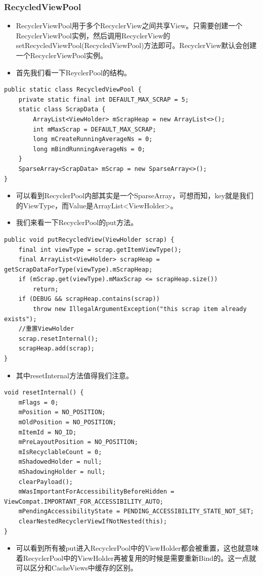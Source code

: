 \documentclass[9pt, b5paper]{article}
\begin{document}
\subsubsection{RecycledViewPool}
\label{sec-5-3-8}
\begin{itemize}
\item RecyclerViewPool用于多个RecyclerView之间共享View。只需要创建一个RecyclerViewPool实例，然后调用RecyclerView的setRecycledViewPool(RecycledViewPool)方法即可。RecyclerView默认会创建一个RecyclerViewPool实例。
\item 首先我们看一下ReyclerPool的结构。
\end{itemize}
\begin{verbatim}
public static class RecycledViewPool {
    private static final int DEFAULT_MAX_SCRAP = 5;
    static class ScrapData {
        ArrayList<ViewHolder> mScrapHeap = new ArrayList<>();
        int mMaxScrap = DEFAULT_MAX_SCRAP;
        long mCreateRunningAverageNs = 0;
        long mBindRunningAverageNs = 0;
    }
    SparseArray<ScrapData> mScrap = new SparseArray<>();
}
\end{verbatim}
\begin{itemize}
\item 可以看到RecyclerPool内部其实是一个SparseArray，可想而知，key就是我们的ViewType，而Value是ArrayList<ViewHolder>。
\item 我们来看一下RecyclerPool的put方法。
\end{itemize}
\begin{verbatim}
public void putRecycledView(ViewHolder scrap) {
    final int viewType = scrap.getItemViewType();
    final ArrayList<ViewHolder> scrapHeap = getScrapDataForType(viewType).mScrapHeap;
    if (mScrap.get(viewType).mMaxScrap <= scrapHeap.size()) 
        return;
    if (DEBUG && scrapHeap.contains(scrap)) 
        throw new IllegalArgumentException("this scrap item already exists");
    //重置ViewHolder
    scrap.resetInternal();
    scrapHeap.add(scrap);
}
\end{verbatim}
\begin{itemize}
\item 其中resetInternal方法值得我们注意。
\end{itemize}
\begin{verbatim}
void resetInternal() {
    mFlags = 0;
    mPosition = NO_POSITION;
    mOldPosition = NO_POSITION;
    mItemId = NO_ID;
    mPreLayoutPosition = NO_POSITION;
    mIsRecyclableCount = 0;
    mShadowedHolder = null;
    mShadowingHolder = null;
    clearPayload();
    mWasImportantForAccessibilityBeforeHidden = ViewCompat.IMPORTANT_FOR_ACCESSIBILITY_AUTO;
    mPendingAccessibilityState = PENDING_ACCESSIBILITY_STATE_NOT_SET;
    clearNestedRecyclerViewIfNotNested(this);
}
\end{verbatim}
\begin{itemize}
\item 可以看到所有被put进入RecyclerPool中的ViewHolder都会被重置，这也就意味着RecyclerPool中的ViewHolder再被复用的时候是需要重新Bind的。这一点就可以区分和CacheViews中缓存的区别。
\end{itemize}
\end{document}
